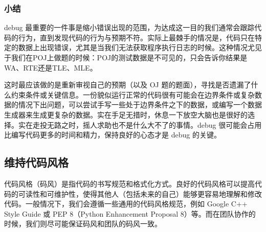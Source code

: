 \documentclass[../main.tex]{subfiles}
\begin{document}
\subsubsection{小结}

debug 最重要的一件事是缩小错误出现的范围，为达成这一目的我们通常会跟踪代码的行为，直到发现代码的行为与预期不符。实际上最棘手的情况是，代码只在特定的数据上出现错误，尤其是当我们无法获取程序执行日志的时候。这种情况尤见于我们在POJ上做题的时候：POJ的测试数据是不可见的，只会告诉你结果是WA、RTE还是TLE、MLE。

这时最应该做的是重新审视自己的预期（以及 OJ 题的题面），寻找是否遗漏了什么约束条件或关键信息。一份貌似运行正常的代码很有可能会在边界条件或复杂数据的情况下出问题，可以尝试手写一些处于边界条件之下的数据，或编写一个数据生成器来生成更复杂的数据。实在手足无措时，休息一下放空大脑也是很好的选择。实在走投无路之时，摇人求助也不是什么大不了的事情。debug 很可能会占用比编写代码更多的时间和精力，保持良好的心态才是 debug 的关键。

\subsection{维持代码风格}\label{sec:code-style}

代码风格（码风）是指代码的书写规范和格式化方式。良好的代码风格可以提高代码的可读性和可维护性，使得其他人（包括未来的自己）能够更容易地理解和修改代码。一般情况下，我们会遵循一些通用的代码风格规范，例如 Google C++ Style Guide 或 PEP 8（Python Enhancement Proposal 8）等。而在团队协作的时候，我们则尽可能保证码风和团队的码风一致。
\end{document}
